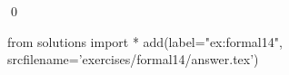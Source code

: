 
\begin{ex} 
  \label{ex:formal14}
  
  \qed
\end{ex} 
\begin{python0}
from solutions import *
add(label="ex:formal14",
    srcfilename='exercises/formal14/answer.tex') 
\end{python0}
